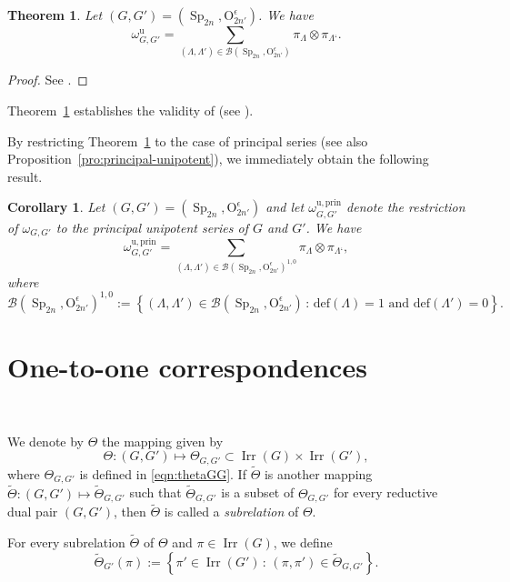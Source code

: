 \documentclass[12pt]{amsart}
\numberwithin{equation}{subsection}
\newtheorem{cor}[equation]{Corollary}
\newtheorem{thm}[equation]{Theorem}
\newcommand{\unip}{\mathrm{u}}
\newcommand{\Irr}{\operatorname{Irr}}
\newcommand{\Sp}{\operatorname{Sp}}
\def\rO{{\mathrm{O}}}
\def\cB{{\mathcal{B}}}
\def\defect{{\mathrm{def}}}
\def\prin{{\mathrm{prin}}}
\begin{document}
\begin{thm} \label{thm:main}
Let $(G,G')=(\Sp_{2n},\rO^\epsilon_{2n'})$. We have
\[\omega_{G,G'}^\unip=\sum_{(\Lambda,\Lambda')\in\cB(\Sp_{2n},\rO^\epsilon_{2n'})}\pi_\Lambda\otimes\pi_{\Lambda‘}.\]
\end{thm}
\begin{proof}
See \cite[Theorem~1.8]{PanAJM}.
\end{proof}

Theorem~\ref{thm:main} establishes the validity of \cite[Conjecture~3.11]{AMR} (see \cite[Proposition~3.9]{PanAJM}).

\smallskip

By restricting Theorem~\ref{thm:main} to the case of principal series (see also Proposition~\ref{pro:principal-unipotent}), we immediately obtain the following result.
\begin{cor} \label{cor:ppal-unip}
Let $(G,G')=(\Sp_{2n},\rO^\epsilon_{2n'})$ and let $\omega_{G,G'}^{\unip,\prin}$ denote the restriction of $\omega_{G,G'}$ to the principal unipotent series of $G$ and $G'$.
We have
\[\omega_{G,G'}^{\unip,\prin}=\sum_{(\Lambda,\Lambda')\in\cB(\Sp_{2n},\rO^\epsilon_{2n'})^{1,0}}\pi_\Lambda\otimes\pi_{\Lambda‘},\]
where {\rm
\[\cB(\Sp_{2n},\rO^\epsilon_{2n'})^{1,0}:=\left\{(\Lambda,\Lambda')\in\cB(\Sp_{2n},\rO^\epsilon_{2n'})\,:\,\text{$\defect(\Lambda)=1$ and $\defect(\Lambda')=0$}\right\}.\]}
\end{cor}

\section{One-to-one correspondences} \label{sec:one-to-one}\

We denote by $\Theta$ the mapping given by
\begin{equation}
\Theta\colon (G,G')\mapsto \Theta_{G,G'}\subset \Irr(G)\times\Irr(G'),
\end{equation}
where $\Theta_{G,G'}$ is defined in \eqref{eqn:thetaGG}.
If $\widetilde{\Theta}$ is another mapping $\widetilde{\Theta}\colon (G,G')\mapsto \widetilde{\Theta}_{G,G'}$ such that $\widetilde{\Theta}_{G,G'}$ is a subset of $\Theta_{G,G'}$ for every reductive dual pair $(G,G')$, then 
$\widetilde{\Theta}$ is called a \textit{subrelation} of $\Theta$.

For every subrelation $\widetilde{\Theta}$ of $\Theta$ and $\pi\in\Irr(G)$, we define
\begin{equation}
\widetilde\Theta_{G'}(\pi):=\left\{\pi'\in \Irr(G')\,:\,(\pi,\pi')\in \widetilde\Theta_{G,G'}\right\}.
\end{equation}
\end{document}

